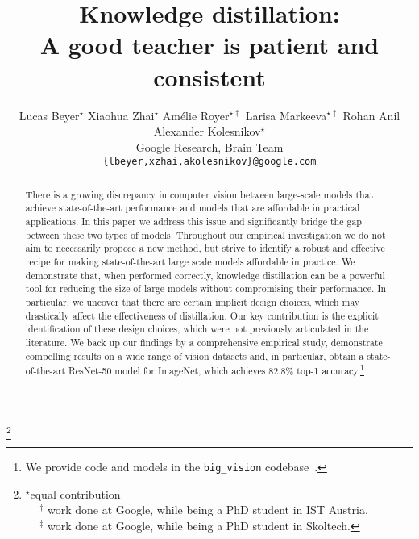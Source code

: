 \documentclass[10pt,twocolumn,letterpaper]{article}
\newcommand{\authsep}{\;\;}
\begin{document}
\title{Knowledge distillation:\\
A good teacher is patient and consistent}

\author{Lucas Beyer$^{\star}$ \authsep Xiaohua Zhai$^{\star}$ \authsep Amélie Royer$^{\star\dagger}$ \authsep Larisa Markeeva$^{\star\ddagger}$ \authsep Rohan Anil \authsep Alexander Kolesnikov$^{\star}$ \\
Google Research, Brain Team \\
\texttt{\{lbeyer,xzhai,akolesnikov\}@google.com}}
\maketitle
{\let\thefootnote\relax\footnote{
{$^{\star}$equal contribution \\ $^{\quad\;\;\ \dagger}$ work done at Google, while being a PhD student in IST Austria. \\ $^{\quad\;\;\ \ddagger}$ work done at Google, while being a PhD student in Skoltech.}}}

\begin{abstract}
There is a growing discrepancy in computer vision between large-scale models that achieve state-of-the-art performance and models that are affordable in practical applications. In this paper we address this issue and significantly bridge the gap between these two types of models. Throughout our empirical investigation we do not aim to necessarily propose a new method, but strive to identify a robust and effective recipe for making state-of-the-art large scale models affordable in practice. We demonstrate that, when performed correctly, knowledge distillation can be a powerful tool for reducing the size of large models without compromising their performance. In particular, we uncover that there are certain implicit design choices, which may drastically affect the effectiveness of distillation. Our key contribution is the explicit identification of these design choices, which were not previously articulated in the literature. We back up our findings by a comprehensive empirical study, demonstrate compelling results on a wide range of vision datasets and, in particular, obtain a state-of-the-art ResNet-50 model for ImageNet, which achieves 82.8\% top-1 accuracy.\footnote{We provide code and models in the {\tt big\_vision} codebase~\cite{big_vision}.}  
\end{abstract}
\end{document}
